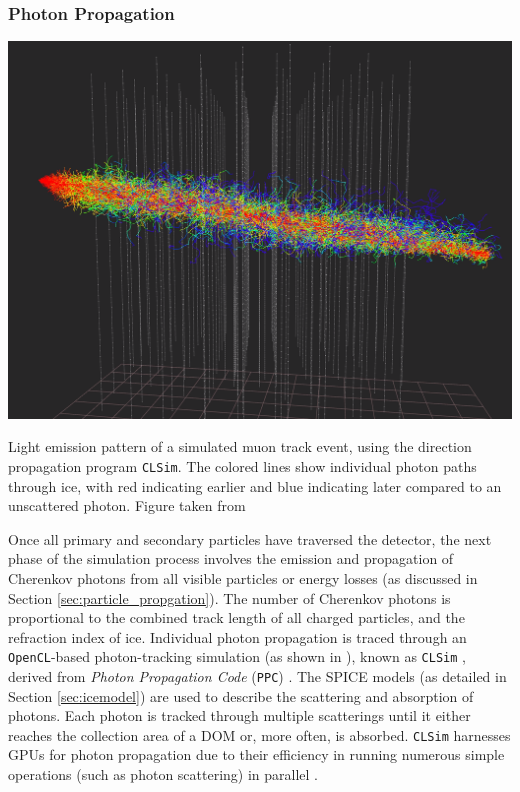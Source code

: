 \subsubsection*{Photon Propagation}
\begin{marginfigure}
    \includegraphics{./figures/EventSample/Icecube_muon_photons.png}
    \caption{Light emission pattern of a simulated muon track event, using the direction propagation program \texttt{CLSim}. The colored lines show individual photon paths through ice, with red indicating earlier and blue indicating later compared to an unscattered photon. Figure taken from \cite{IC_photon_picture}}
    
\end{marginfigure}
Once all primary and secondary particles have traversed the detector, the next phase of the simulation process involves the emission and propagation of Cherenkov photons from all visible particles or energy losses (as discussed in Section \ref{sec:particle_propgation}). The number of Cherenkov photons is proportional to the combined track length of all charged particles, and the refraction index of ice. Individual photon propagation is traced through an \texttt{OpenCL}-based photon-tracking simulation (as shown in ), known as \texttt{CLSim} , derived from \emph{Photon Propagation Code} (\texttt{PPC}) . The SPICE models (as detailed in Section \ref{sec:icemodel})  are used to describe the scattering and absorption of photons. Each photon is tracked through multiple scatterings until it either reaches the collection area of a DOM or, more often, is absorbed. \texttt{CLSim} harnesses GPUs for photon propagation due to their efficiency in running numerous simple operations (such as photon scattering) in parallel \cite{PPC_dima}. 

